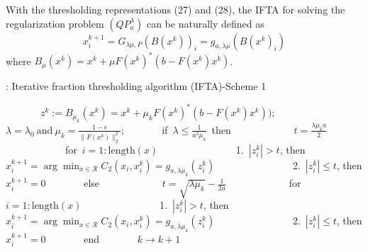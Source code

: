 \documentclass[smallextended]{svjour3}
\begin{document}
With the thresholding representations (27) and (28), the IFTA for solving the regularization problem $(QP_{a}^{\lambda})$ can be naturally defined as
\begin{equation}\label{r29}
x_{i}^{k+1}=G_{\lambda\mu, P}(B(x^{k}))_{i}=g_{a,\lambda\mu}(B(x^{k})_{i})
\end{equation}
where $B_{\mu}(x^{k})=x^{k}+\mu F(x^{k})^{\ast}(b-F(x^{k})x^{k})$.

\begin{algorithm}[h!]
\caption{: Iterative fraction thresholding algorithm (IFTA)-Scheme 1}
\label{alg:A}
\begin{algorithmic}
\STATE \ \ \ \ \ \ \ {$z^{k}:=B_{\mu_{k}}(x^{k})=x^{k}+\mu_{k} F(x^{k})^{\ast}(b-F(x^{k})x^{k}))$;}
\STATE \ \ \ \ \ \ \ {$\lambda=\lambda_{0}\ \mathrm{and}\ \mu_{k}=\frac{1-\epsilon}{\|F(x^{k})\|_{2}^{2}}$;}
\STATE \ \ \ \ \ \ \ {if\ $\lambda\leq\frac{1}{a^{2}\mu_{k}}$\ then}
\STATE \ \ \ \ \ \ \ \ \ \ \ \ {$t=\frac{\lambda\mu_{k} a}{2}$}
\STATE \ \ \ \ \ \ \ \ \ \ \ \ {for\ $i=1:\mathrm{length}(x)$}
\STATE \ \ \ \ \ \ \ \ \ \ \ \ \ \ \ {1.\ $|z^{k}_{i}|>t$, then $x^{k+1}_{i}=\displaystyle\arg\min_{x\in \mathcal{R}}C_{2}(x_{i},x_{i}^{k})=g_{a,\lambda\mu_{k}}(z^{k}_{i})$}
\STATE \ \ \ \ \ \ \ \ \ \ \ \ \ \ \ {2.\ $|z^{k}_{i}|\leq t$, then $x^{k+1}_{i}=0$}
\STATE \ \ \ \ \ \ \ {else}
\STATE \ \ \ \ \ \ \ \ \ \ \ \ {$t=\sqrt{\lambda\mu_{k}}-\frac{1}{2a}$}
\STATE \ \ \ \ \ \ \ \ \ \ \ \ {for\ $i=1:\mathrm{length}(x)$}
\STATE \ \ \ \ \ \ \ \ \ \ \ \ \ \ \ {1.\ $|z^{k}_{i}|>t$, then $x^{k+1}_{i}=\displaystyle\arg\min_{x\in \mathcal{R}}C_{2}(x_{i},x_{i}^{k})=g_{a,\lambda\mu_{k}}(z^{k}_{i})$}
\STATE \ \ \ \ \ \ \ \ \ \ \ \ \ \ \ {2.\ $|z^{k}_{i}|\leq t$, then $x^{k+1}_{i}=0$}
\STATE \ \ \ \ \ \ \ {end}
\STATE \ \ \ \ \ \ \ {$k\rightarrow k+1$}
\end{algorithmic}
\end{algorithm}
\end{document}
